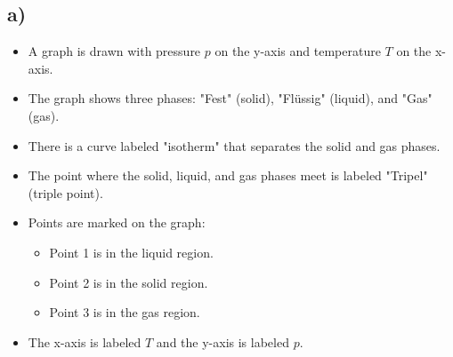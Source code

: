 

\subsection*{a)}

\begin{itemize}
    \item A graph is drawn with pressure \( p \) on the y-axis and temperature \( T \) on the x-axis.
    \item The graph shows three phases: "Fest" (solid), "Flüssig" (liquid), and "Gas" (gas).
    \item There is a curve labeled "isotherm" that separates the solid and gas phases.
    \item The point where the solid, liquid, and gas phases meet is labeled "Tripel" (triple point).
    \item Points are marked on the graph:
        \begin{itemize}
            \item Point 1 is in the liquid region.
            \item Point 2 is in the solid region.
            \item Point 3 is in the gas region.
        \end{itemize}
    \item The x-axis is labeled \( T \) and the y-axis is labeled \( p \).
\end{itemize}